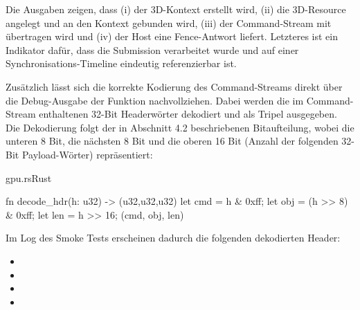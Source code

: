 Die Ausgaben zeigen, dass (i) der 3D-Kontext erstellt wird, (ii) die 3D-Resource angelegt und an den Kontext gebunden wird, (iii) der Command-Stream mit  übertragen wird und (iv) der Host eine Fence-Antwort liefert. Letzteres ist ein Indikator dafür, dass die Submission verarbeitet wurde und auf einer Synchronisations-Timeline eindeutig referenzierbar ist.

Zusätzlich lässt sich die korrekte Kodierung des Command-Streams direkt über die Debug-Ausgabe der Funktion  nachvollziehen. Dabei werden die im Command-Stream enthaltenen 32-Bit Headerwörter dekodiert und als Tripel  ausgegeben. Die Dekodierung folgt der in Abschnitt 4.2 beschriebenen Bitaufteilung, wobei  die unteren 8 Bit,  die nächsten 8 Bit und  die oberen 16 Bit (Anzahl der folgenden 32-Bit Payload-Wörter) repräsentiert:

\begin{codeblock}{gpu.rs}{Rust}
  \begin{rustcode}
fn decode_hdr(h: u32) -> (u32,u32,u32) {
    let cmd =  h        & 0xff;
    let obj = (h >> 8)  & 0xff;
    let len =  h >> 16;
    (cmd, obj, len)
}
  \end{rustcode}
\end{codeblock}

Im Log des Smoke Tests erscheinen dadurch die folgenden dekodierten Header:

\begin{itemize}
	\item {}
	\item {}
	\item {}
	\item {}
\end{itemize}

